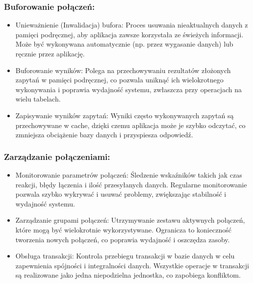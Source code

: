 \documentclass[a4paper,11pt,openany,english]{sphinxmanual}
\begin{document}
\subsubsection{Buforowanie połączeń:}
\label{\detokenize{rozdzial2/Wydajnosc-Skalowanie-i-Replikacja/index:buforowanie-polaczen}}\begin{itemize}
\item {} 
\sphinxAtStartPar
Unieważnienie (Inwalidacja) bufora: Proces usuwania nieaktualnych danych z pamięci podręcznej, aby aplikacja zawsze korzystała ze świeżych informacji. Może być wykonywana automatycznie (np. przez wygasanie danych) lub ręcznie przez aplikację.

\item {} 
\sphinxAtStartPar
Buforowanie wyników: Polega na przechowywaniu rezultatów złożonych zapytań w pamięci podręcznej, co pozwala uniknąć ich wielokrotnego wykonywania i poprawia wydajność systemu, zwłaszcza przy operacjach na wielu tabelach.

\item {} 
\sphinxAtStartPar
Zapisywanie wyników zapytań: Wyniki często wykonywanych zapytań są przechowywane w cache, dzięki czemu aplikacja może je szybko odczytać, co zmniejsza obciążenie bazy danych i przyspiesza odpowiedź.

\end{itemize}


\subsubsection{Zarządzanie połączeniami:}
\label{\detokenize{rozdzial2/Wydajnosc-Skalowanie-i-Replikacja/index:zarzadzanie-polaczeniami}}\begin{itemize}
\item {} 
\sphinxAtStartPar
Monitorowanie parametrów połączeń: Śledzenie wskaźników takich jak czas reakcji, błędy łączenia i ilość przesyłanych danych. Regularne monitorowanie pozwala szybko wykrywać i usuwać problemy, zwiększając stabilność i wydajność systemu.

\item {} 
\sphinxAtStartPar
Zarządzanie grupami połączeń: Utrzymywanie zestawu aktywnych połączeń, które mogą być wielokrotnie wykorzystywane. Ogranicza to konieczność tworzenia nowych połączeń, co poprawia wydajność i oszczędza zasoby.

\item {} 
\sphinxAtStartPar
Obsługa transakcji: Kontrola przebiegu transakcji w bazie danych w celu zapewnienia spójności i integralności danych. Wszystkie operacje w transakcji są realizowane jako jedna niepodzielna jednostka, co zapobiega konfliktom.

\end{itemize}
\end{document}

